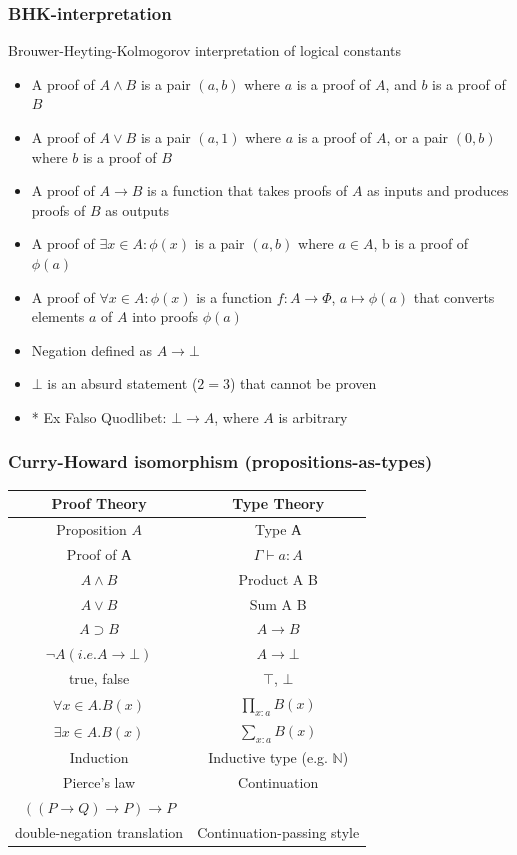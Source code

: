\documentclass[xetex]{beamer}
\begin{document}
\begin{frame}
  \frametitle{BHK-interpretation}
  Brouwer-Heyting-Kolmogorov interpretation of logical constants
  \begin{itemize}
  \item A proof of $A \wedge B$ is a pair $(a, b)$ where $a$
    is a proof of $A$, and $b$ is a proof of $B$
  \item A proof of $A \vee B$ is a pair $(a, 1)$ where $a$
    is a proof of $A$, or a pair $(0, b)$ where $b$ is a proof of $B$
  \item A proof of $A \longrightarrow B$ is a function that takes
    proofs of $A$ as inputs and produces proofs of $B$ as outputs
  \item A proof of $\exists x \in A : \phi(x)$ is a pair
    $(a, b)$ where $a \in A$, b is a proof of $\phi(a)$
  \item A proof of $\forall x \in A : \phi(x)$ is a function
    $f : A \longrightarrow \Phi$, $a \mapsto \phi(a)$ that
    converts elements $a$ of $A$ into proofs $\phi(a)$
  \item Negation defined as $A \longrightarrow \bot$
  \item $\bot$ is an absurd statement ($2 = 3$) that cannot be proven
  \item * Ex Falso Quodlibet: $\bot \longrightarrow A$, where $A$ is arbitrary
  \end{itemize}
\end{frame}

\begin{frame}
  \frametitle{Curry-Howard isomorphism (propositions-as-types)}

\begin{center}
\begin{tabular}{ | c | c | }
  \hline
  Proof Theory & Type Theory \\ \hline
  Proposition $A$ & Type $А$ \\
  Proof of $А$ & $\Gamma \vdash a : A$ \\
  $ A \wedge B $ & Product A B \\
  $ A \vee B$ & Sum A B  \\
  $ A \supset B $ & $ A \rightarrow B $ \\
  $\neg A (i. e. A \rightarrow \bot)$ & $ A \rightarrow \bot$  \\
  true, false & $\top$, $\bot$  \\
  \hline
  $\forall x \in A . B(x)$ & $\prod_{x:a}^{} B(x)$  \\
  $\exists x \in A . B(x)$ & $\sum_{x:a}^{} B(x)$  \\
  \hline
  Induction & Inductive type (e.g. $\mathbb{N}$) \\
  \hline
  Pierce's law  & Continuation  \\
  $ ((P \rightarrow Q) \rightarrow P) \rightarrow P$ & \\
  \hline
  double-negation translation & Continuation-passing style \\
  \hline 
\end{tabular}
\end{center}
\end{frame}
\end{document}
